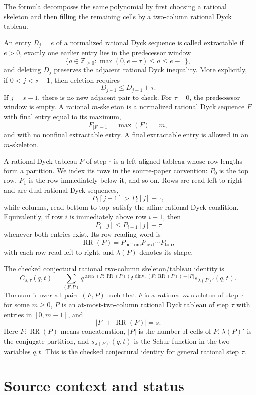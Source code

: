 \documentclass{article}
\DeclareMathOperator{\area}{area}
\DeclareMathOperator{\dinv}{dinv}
\begin{document}
The formula decomposes the same polynomial by first choosing a rational
skeleton and then filling the remaining cells by a two-column rational Dyck
tableau.

An entry \(D_j=e\) of a normalized rational Dyck sequence is called
extractable if \(e>0\), exactly one earlier entry lies in the predecessor
window
\[
  \{a\in\mathbb Z_{\geq 0}: \max(0,e-\tau)\leq a\leq e-1\},
\]
and deleting \(D_j\) preserves the adjacent rational Dyck inequality.  More
explicitly, if \(0<j<s-1\), then deletion requires
\[
  D_{j+1}\leq D_{j-1}+\tau.
\]
If \(j=s-1\), there is no new adjacent pair to check.  For \(\tau=0\), the
predecessor window is empty.  A rational \(m\)-skeleton is a normalized
rational Dyck sequence \(F\) with final entry equal to its maximum,
\[
  F_{|F|-1}=\max(F)=m,
\]
and with no nonfinal extractable entry.  A final extractable entry is allowed
in an \(m\)-skeleton.

A rational Dyck tableau \(P\) of step \(\tau\) is a left-aligned tableau whose
row lengths form a partition.  We index its rows in the source-paper
convention: \(P_0\) is the top row, \(P_1\) is the row immediately below it,
and so on.  Rows are read left to right and are dual rational Dyck sequences,
\[
  P_i[j+1]>P_i[j]+\tau,
\]
while columns, read bottom to top, satisfy the affine rational Dyck condition.
Equivalently, if row \(i\) is immediately above row \(i+1\), then
\[
  P_i[j]\leq P_{i+1}[j]+\tau
\]
whenever both entries exist.  Its row-reading word is
\[
  \operatorname{RR}(P)=P_{\text{bottom}}P_{\text{next}}\cdots P_{\text{top}},
\]
with each row read left to right, and \(\lambda(P)\) denotes its shape.

The checked conjectural rational two-column skeleton/tableau identity is
\[
  C_{s,\tau}(q,t)
  =
  \sum_{(F,P)}
  q^{\area(F:\operatorname{RR}(P))}
  t^{\dinv_\tau(F:\operatorname{RR}(P))-|P|}
  s_{\lambda(P)'}(q,t).
\]
The sum is over all pairs \((F,P)\) such that \(F\) is a rational
\(m\)-skeleton of step \(\tau\) for some \(m\geq 0\), \(P\) is an
at-most-two-column rational Dyck tableau of step \(\tau\) with entries in
\([0,m-1]\), and
\[
  |F|+|\operatorname{RR}(P)|=s.
\]
Here \(F:\operatorname{RR}(P)\) means concatenation, \(|P|\) is the number of
cells of \(P\), \(\lambda(P)'\) is the conjugate partition, and
\(s_{\lambda(P)'}(q,t)\) is the Schur function in the two variables \(q,t\).
This is the checked conjectural identity for general rational step
\(\tau\).

\section{Source context and status}
\end{document}
